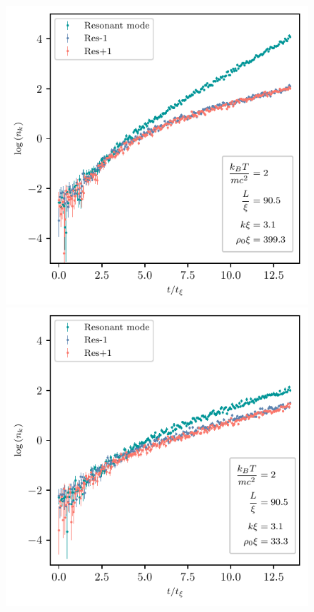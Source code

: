 \documentclass[aps,prd,notitlepage,amsfonts,amssymb,amsmath,nofootinbib,superscriptaddress,longbibliography]{revtex4-2}
\begin{document}
\begin{appendices}
\begin{figure}
    \centering
    \begin{minipage}{0.49\textwidth}
        \centering
        \includegraphics[width=\textwidth]{fig14a.pdf}
    \end{minipage} \hfill
    \begin{minipage}{0.49\textwidth}
        \centering
        \includegraphics[width=\textwidth]{fig14b.pdf}

\end{minipage}
\end{figure}
\end{appendices}
\end{document}
